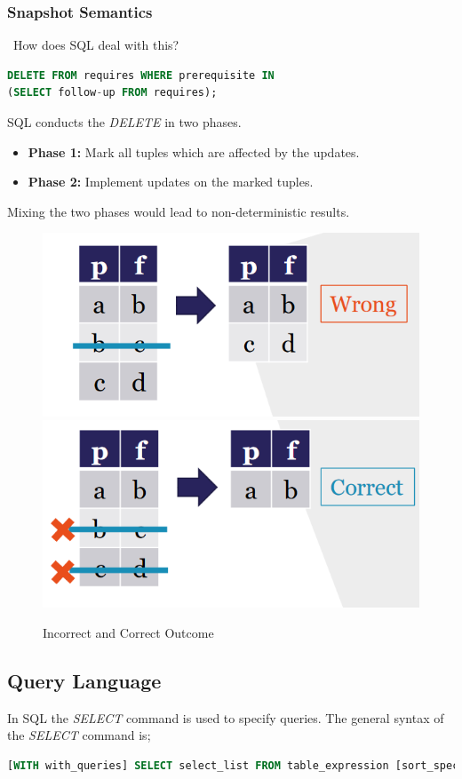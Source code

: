 \subsubsection{Snapshot Semantics}\
How does SQL deal with this?
\begin{lstlisting}[language=SQL]
DELETE FROM requires WHERE prerequisite IN 
(SELECT follow-up FROM requires);
\end{lstlisting}
SQL conducts the \textit{DELETE} in two phases.
\begin{itemize}
\item \textbf{Phase 1:} {\color{orange} Mark} all tuples which are affected by the updates.
\item \textbf{Phase 2:} {\color{NavyBlue} Implement} updates on the marked tuples.
\end{itemize}
Mixing the two phases would lead to non-deterministic results.
\begin{figure}[H]
\centering
\includegraphics[width=.4\textwidth]{images/snapshot_semantics.PNG}
\includegraphics[width=.4\textwidth]{images/snapshot_semantics2.PNG}
\caption{Incorrect and Correct Outcome}
\label{snapshot_semantics}
\end{figure}

\subsection{Query Language}
In SQL the \textit{SELECT} command is used to specify queries. The general syntax of the \textit{SELECT} command is;
\begin{lstlisting}[language=SQL]
[WITH with_queries] SELECT select_list FROM table_expression [sort_specification]
\end{lstlisting}

